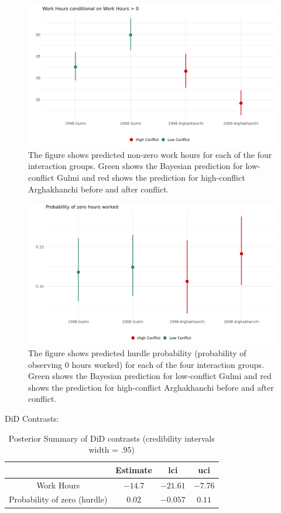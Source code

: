 \documentclass[12pt,a4paper]{article}
\providecommand{\tabularnewline}{\\}
\begin{document}
\begin{figure}[H]
	\centering
	\includegraphics[width=1\textwidth]{../Analysis files/coefplot_map.jpg}
	\caption{The figure shows predicted non-zero work hours for each of the four interaction groups. Green shows the Bayesian prediction for low-conflict Gulmi and red shows the prediction for high-conflict Arghakhanchi before and after conflict.}
	\label{fig:coefplot_map}
\end{figure}

\begin{figure}[H]
	\centering
	\includegraphics[width=1\textwidth]{../Analysis files/coefplot_map_hu.jpg}
	\caption{The figure shows predicted hurdle probability (probability of observing $0$ hours worked) for each of the four interaction groups. Green shows the Bayesian prediction for low-conflict Gulmi and red shows the prediction for high-conflict Arghakhanchi before and after conflict.}
	\label{fig:coefplot_map_hu}
\end{figure}

DiD Contrasts:

\begin{table}[H]
	\caption{Posterior Summary of DiD contrasts (credibility intervals width = $.95$)}
	
	\renewcommand{\arraystretch}{1.2}
	\vspace{1em}
	\centering{}%
	\begin{tabular}{c|c|c|c|}
		& Estimate & lci& uci \tabularnewline
		\hline 
		Work Hours & $-14.7$ & $-21.61$ & $-7.76$ \tabularnewline
		Probability of zero (hurdle) & $0.02$ & $-0.057$ & $0.11$ \tabularnewline
		\hline 
	\end{tabular}
\end{table}
\end{document}
